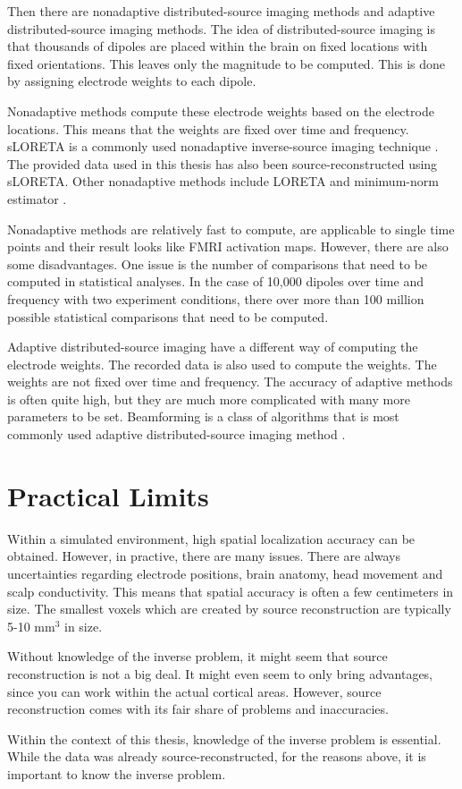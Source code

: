 Then there are nonadaptive distributed-source imaging methods and adaptive distributed-source imaging methods. The idea of distributed-source imaging is that thousands of dipoles are placed within the brain on fixed locations with fixed orientations. This leaves only the magnitude to be computed. This is done by assigning electrode weights to each dipole.

Nonadaptive methods compute these electrode weights based on the electrode locations. This means that the weights are fixed over time and frequency. sLORETA is a commonly used nonadaptive inverse-source imaging technique \cite{pascual2002standardized}. The provided data used in this thesis has also been source-reconstructed using sLORETA. Other nonadaptive methods include LORETA and minimum-norm estimator \cite{pascual1994low, hamalainen1994interpreting}.

Nonadaptive methods are relatively fast to compute, are applicable to single time points and their result looks like FMRI activation maps. However, there are also some disadvantages. One issue is the number of comparisons that need to be computed in statistical analyses. In the case of 10,000 dipoles over time and frequency with two experiment conditions, there over more than 100 million possible statistical comparisons that need to be computed. \cite{cohen2014analyzing}

Adaptive distributed-source imaging have a different way of computing the electrode weights. The recorded data is also used to compute the weights. The weights are not fixed over time and frequency. The accuracy of adaptive methods is often quite high, but they are much more complicated with many more parameters to be set. Beamforming is a class of algorithms that is most commonly used adaptive distributed-source imaging method \cite{gross2001dynamic, van1997localization}. 

\section{Practical Limits}

Within a simulated environment, high spatial localization accuracy can be obtained. However, in practive, there are many issues. There are always uncertainties regarding electrode positions, brain anatomy, head movement and scalp conductivity. This means that spatial accuracy is often a few centimeters in size. The smallest voxels which are created by source reconstruction are typically 5-10 mm$^3$ in size. \cite{grech2008review} 

Without knowledge of the inverse problem, it might seem that source reconstruction is not a big deal. It might even seem to only bring advantages, since you can work within the actual cortical areas. However, source reconstruction comes with its fair share of problems and inaccuracies. 

Within the context of this thesis, knowledge of the inverse problem is essential. While the data was already source-reconstructed, for the reasons above, it is important to know the inverse problem. 